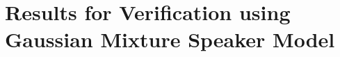 \chapter{Results for Verification using Gaussian Mixture Speaker Model}
\label{apx:gmsm-verify-results}